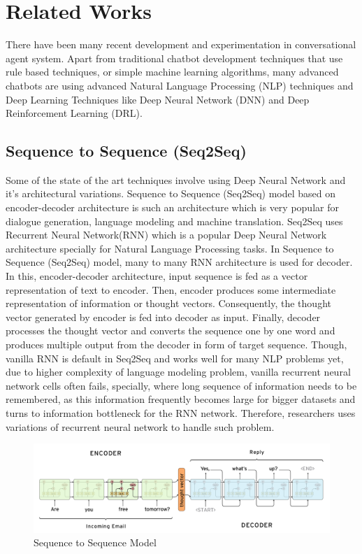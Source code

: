 \documentclass[a4paper,12pt]{report}
\begin{document}
{\let\clearpage\relax \chapter {Related Works}}
\noindent There have been many recent development and experimentation in conversational agent system. Apart from traditional chatbot development techniques that use rule based techniques, or simple machine learning algorithms, many advanced chatbots are using advanced Natural Language Processing (NLP) techniques and Deep Learning Techniques like Deep Neural Network (DNN) and Deep Reinforcement Learning (DRL).
\section{Sequence to Sequence (Seq2Seq)}
Some of the state of the art techniques involve using Deep Neural Network and it's architectural variations. Sequence to Sequence (Seq2Seq) model based on encoder-decoder architecture is such an architecture which is very popular for dialogue generation, language modeling and machine translation. Seq2Seq uses Recurrent Neural Network(RNN) which is a popular Deep Neural Network architecture specially for Natural Language Processing tasks. In Sequence to Sequence (Seq2Seq) model, many to many RNN architecture is used for decoder. In this, encoder-decoder architecture, input sequence is fed as a vector representation of text to encoder. Then, encoder produces some intermediate representation of information or thought vectors. Consequently, the thought vector generated by encoder is fed into decoder as input. Finally, decoder processes the thought vector and converts the sequence one by one word and produces multiple output from the decoder in form of target sequence. Though, vanilla RNN is default in Seq2Seq and works well for many NLP problems yet, due to higher complexity of language modeling problem, vanilla recurrent neural network cells often fails, specially, where long sequence of information needs to be remembered, as this information frequently becomes large for bigger datasets and turns to information bottleneck for the RNN network. Therefore, researchers uses variations of recurrent neural network to handle such problem.
\begin{figure}[H]
\begin{center}
\includegraphics[scale=.3]{seq2seq_related}
\caption{Sequence to Sequence Model}
\end{center}
\end{figure} 
\end{document}
